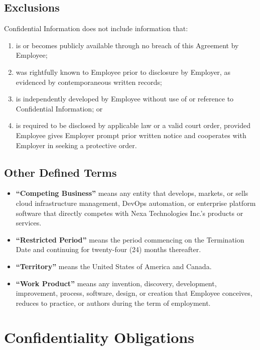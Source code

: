 \documentclass[11pt,a4paper]{article}
\begin{document}
\subsection{Exclusions}
\noindent
Confidential Information does not include information that:

\begin{enumerate}[label=(\roman*), leftmargin=2em, itemsep=2pt]
  \item is or becomes publicly available through no breach of this Agreement by Employee;
  \item was rightfully known to Employee prior to disclosure by Employer, as evidenced
        by contemporaneous written records;
  \item is independently developed by Employee without use of or reference to Confidential
        Information; or
  \item is required to be disclosed by applicable law or a valid court order, provided
        Employee gives Employer prompt prior written notice and cooperates with Employer
        in seeking a protective order.
\end{enumerate}

\subsection{Other Defined Terms}

\begin{itemize}[leftmargin=2em, itemsep=3pt]
  \item \textbf{``Competing Business''} means any entity that develops, markets, or sells
        cloud infrastructure management, DevOps automation, or enterprise platform software
        that directly competes with Nexa Technologies Inc.'s products or services.
  \item \textbf{``Restricted Period''} means the period commencing on the Termination Date
        and continuing for twenty-four (24) months thereafter.
  \item \textbf{``Territory''} means the United States of America and Canada.
  \item \textbf{``Work Product''} means any invention, discovery, development, improvement,
        process, software, design, or creation that Employee conceives, reduces to practice,
        or authors during the term of employment.
\end{itemize}

\section{Confidentiality Obligations}
\end{document}
